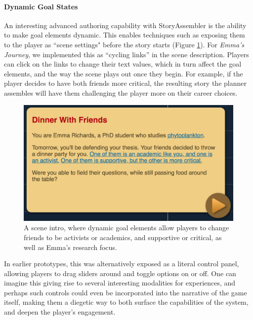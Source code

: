 \paragraph{Dynamic Goal States}
\label{dynamic-story-specs}

An interesting advanced authoring capability with StoryAssembler is the ability to make goal elements dynamic. This enables techniques such as exposing them to the player as ``scene settings" before the story starts (Figure \ref{fig:parameterized-summary}). For \textit{Emma's Journey}, we implemented this as ``cycling links'' in the scene description. Players can click on the links to change their text values, which in turn affect the goal elements, and the way the scene plays out once they begin. For example, if the player decides to have both friends more critical, the resulting story the planner assembles will have them challenging the player more on their career choices.


\begin{figure}
    \centering
    \includegraphics[width=\textwidth]{figures/3-StoryAssembler/parameterized-summary.png}
    \caption{A scene intro, where dynamic goal elements allow players to change friends to be activists or academics, and supportive or critical, as well as Emma's research focus.}
    \label{fig:parameterized-summary}
\end{figure}


In earlier prototypes, this was alternatively exposed as a literal control panel, allowing players to drag sliders around and toggle options on or off. One can imagine this giving rise to several interesting modalities for experiences, and perhaps such controls could even be incorporated into the narrative of the game itself, making them a diegetic way to both surface the capabilities of the system, and deepen the player's engagement.

